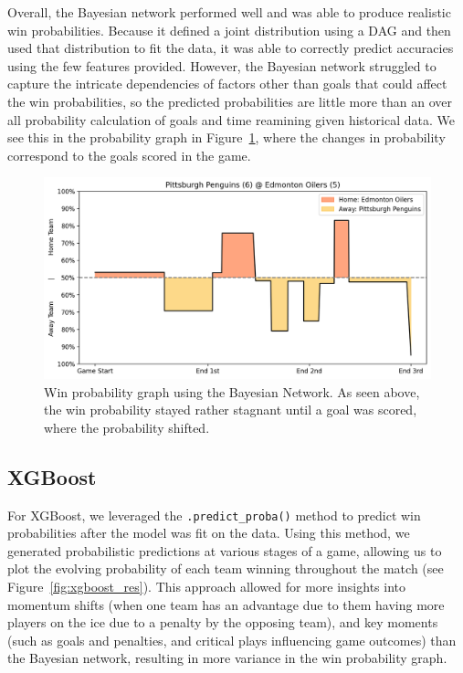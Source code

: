 \documentclass[11pt]{article}
\begin{document}
Overall, the Bayesian network performed well and was able to produce realistic win probabilities. Because it defined a joint distribution using a DAG and
then used that distribution to fit the data, it was able to correctly predict accuracies using the few features provided. However, the Bayesian network struggled to capture the intricate dependencies
of factors other than goals that could affect the win probabilities, so the predicted probabilities are little more than an over all probability calculation of goals and time reamining given historical data.
We see this in the probability graph in Figure~\ref{fig:bayesian_graph}, where the changes in probability correspond to the goals scored in the game. 

\begin{figure}
    \centering
    \includegraphics[width=\textwidth]{images/good_bayesian_example.png}
    \caption{Win probability graph using the Bayesian Network. As seen above, the win probability stayed rather stagnant until a goal was scored, where the probability shifted.}
    \label{fig:bayesian_graph}
\end{figure}

\subsection{XGBoost}

For XGBoost, we leveraged the {\tt .predict\_proba()} method to predict win probabilities after the model was fit on the data.
Using this method, we generated 
probabilistic predictions at various stages of a game, allowing us to 
plot the evolving probability of each team winning throughout the match
(see Figure~\ref{fig:xgboost_res}). 
This approach allowed for more insights into momentum shifts (when one team 
has an advantage due to them having more players on the ice due to 
a penalty by the opposing team), and key moments (such as goals and 
penalties, and critical plays influencing game outcomes) than the Bayesian network, resulting in more variance in the win probability graph.
\end{document}
